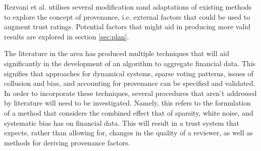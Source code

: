 Rezvani et al. \cite{rezvani2018provenance} utilises several modification sand adaptations of existing methods to explore the concept of provenance, i.e. external factors that could be used to augment trust ratings. Potential factors that might aid in producing more valid results are explored in section \ref{sec:plan}.

The literature in the area has produced multiple techniques that will aid significantly in the development of an algorithm to aggregate financial data. This signifies that approaches for dynamical systems, sparse voting patterns, issues of collusion and bias, and accounting for provenance can be specified and validated. In order to incorporate these techniques, several procedures that aren't addressed by literature will need to be investigated. Namely, this refers to the formulation of a method that considers the combined effect that of sparsity, white noise, and systematic bias has on financial data. This will result in a trust system that expects, rather than allowing for, changes in the quality of a reviewer, as well as methods for deriving provenance factors.